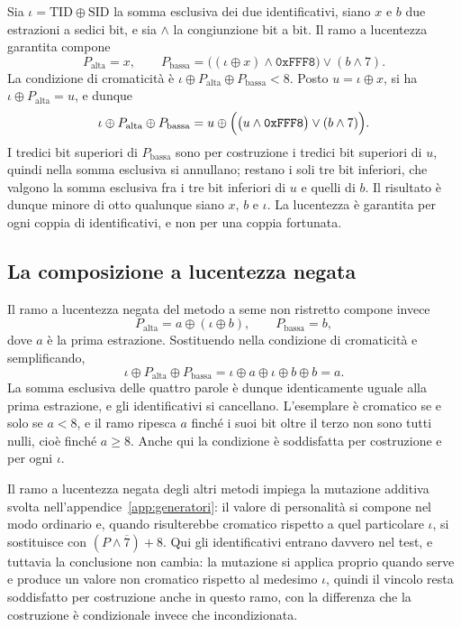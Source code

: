 Sia $\iota = \mathrm{TID} \oplus \mathrm{SID}$ la somma esclusiva dei due identificativi, siano $x$ e $b$ due estrazioni a sedici bit, e sia $\wedge$ la congiunzione bit a bit. Il ramo a lucentezza garantita compone
\[
P_{\mathrm{alta}} = x,
\qquad
P_{\mathrm{bassa}} = \bigl((\iota \oplus x) \wedge \mathtt{0xFFF8}\bigr) \vee (b \wedge 7).
\]
La condizione di cromaticità è $\iota \oplus P_{\mathrm{alta}} \oplus P_{\mathrm{bassa}} < 8$. Posto $u = \iota \oplus x$, si ha $\iota \oplus P_{\mathrm{alta}} = u$, e dunque
\[
\iota \oplus P_{\mathrm{alta}} \oplus P_{\mathrm{bassa}}
= u \oplus \Bigl(\bigl(u \wedge \mathtt{0xFFF8}\bigr) \vee (b \wedge 7)\Bigr).
\]
I tredici bit superiori di $P_{\mathrm{bassa}}$ sono per costruzione i tredici bit superiori di $u$, quindi nella somma esclusiva si annullano; restano i soli tre bit inferiori, che valgono la somma esclusiva fra i tre bit inferiori di $u$ e quelli di $b$. Il risultato è dunque minore di otto qualunque siano $x$, $b$ e $\iota$. La lucentezza è garantita per ogni coppia di identificativi, e non per una coppia fortunata.

\subsection{La composizione a lucentezza negata}

Il ramo a lucentezza negata del metodo a seme non ristretto compone invece
\[
P_{\mathrm{alta}} = a \oplus (\iota \oplus b),
\qquad
P_{\mathrm{bassa}} = b,
\]
dove $a$ è la prima estrazione. Sostituendo nella condizione di cromaticità e semplificando,
\[
\iota \oplus P_{\mathrm{alta}} \oplus P_{\mathrm{bassa}}
= \iota \oplus a \oplus \iota \oplus b \oplus b
= a .
\]
La somma esclusiva delle quattro parole è dunque identicamente uguale alla prima estrazione, e gli identificativi si cancellano. L'esemplare è cromatico se e solo se $a < 8$, e il ramo ripesca $a$ finché i suoi bit oltre il terzo non sono tutti nulli, cioè finché $a \geq 8$. Anche qui la condizione è soddisfatta per costruzione e per ogni $\iota$.

Il ramo a lucentezza negata degli altri metodi impiega la mutazione additiva svolta nell'appendice~\ref{app:generatori}: il valore di personalità si compone nel modo ordinario e, quando risulterebbe cromatico rispetto a quel particolare $\iota$, si sostituisce con $(P \wedge \overline{7}) + 8$. Qui gli identificativi entrano davvero nel test, e tuttavia la conclusione non cambia: la mutazione si applica proprio quando serve e produce un valore non cromatico rispetto al medesimo $\iota$, quindi il vincolo resta soddisfatto per costruzione anche in questo ramo, con la differenza che la costruzione è condizionale invece che incondizionata.

